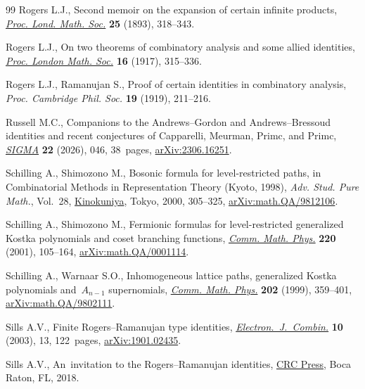 \documentclass[pdftex]{sigma}
\numberwithin{equation}{section}
\begin{document}
\begin{thebibliography}{99}
Rogers L.J., Second memoir on the expansion of certain infinite products,
 \href{https://doi.org/10.1112/plms/s1-25.1.318}{\textit{Proc. Lond. Math.
 Soc.}} \textbf{25} (1893), 318--343.

Rogers L.J., On two theorems of combinatory analysis and some allied
 identities, \href{https://doi.org/10.1112/plms/s2-16.1.315}{\textit{Proc.
 London Math. Soc.}} \textbf{16} (1917), 315--336.

Rogers L.J., Ramanujan S., Proof of certain identities in combinatory analysis,
 \textit{Proc. Cambridge Phil. Soc.} \textbf{19} (1919), 211--216.

Russell M.C., Companions to the {A}ndrews--{G}ordon and {A}ndrews--{B}ressoud
 identities and recent conjectures of {C}apparelli, {M}eurman, {P}rimc, and
 {P}rimc, \href{https://doi.org/10.3842/SIGMA.2026.046}{\textit{SIGMA}}
 \textbf{22} (2026), 046, 38~pages,
 \href{http://arxiv.org/abs/2306.16251}{arXiv:2306.16251}.

Schilling A., Shimozono M., Bosonic formula for level-restricted paths, in
 Combinatorial Methods in Representation Theory ({K}yoto, 1998), \textit{Adv.
 Stud. Pure Math.}, Vol.~28,
 \href{https://doi.org/10.2969/aspm/02810305}{Kinokuniya}, Tokyo, 2000,
 305--325, \href{http://arxiv.org/abs/math.QA/9812106}{arXiv:math.QA/9812106}.

Schilling A., Shimozono M., Fermionic formulas for level-restricted generalized
 {K}ostka polynomials and coset branching functions,
 \href{https://doi.org/10.1007/s002200100443}{\textit{Comm. Math. Phys.}}
 \textbf{220} (2001), 105--164,
 \href{http://arxiv.org/abs/math.QA/0001114}{arXiv:math.QA/0001114}.

Schilling A., Warnaar S.O., Inhomogeneous lattice paths, generalized {K}ostka
 polynomials and~{$A_{n-1}$} supernomials,
 \href{https://doi.org/10.1007/s002200050586}{\textit{Comm. Math. Phys.}}
 \textbf{202} (1999), 359--401,
 \href{http://arxiv.org/abs/math.QA/9802111}{arXiv:math.QA/9802111}.

Sills A.V., Finite {R}ogers--{R}amanujan type identities,
 \href{https://doi.org/10.37236/1706}{\textit{Electron.~J.~Combin.}}
 \textbf{10} (2003), 13, 122~pages,
 \href{http://arxiv.org/abs/1901.02435}{arXiv:1901.02435}.

Sills A.V., An~invitation to the {R}ogers--{R}amanujan identities,
 \href{https://doi.org/10.1201/9781315151922}{CRC Press}, Boca Raton, FL,
 2018.


\end{thebibliography}
\end{document}
